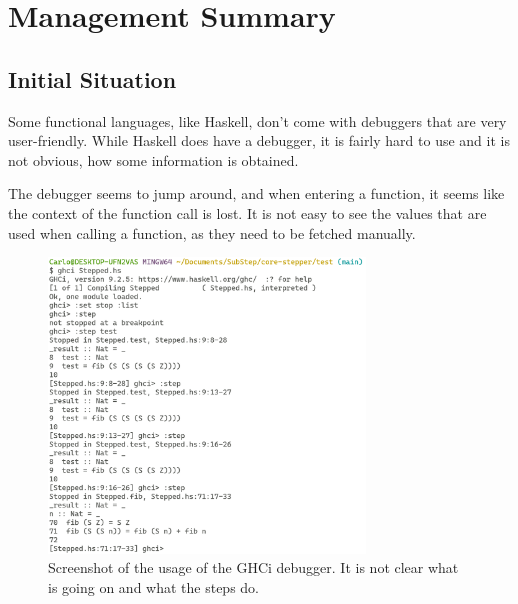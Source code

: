 \chapter{Management Summary}


\section{Initial Situation}
Some functional languages, like Haskell, don't come with debuggers that are very user-friendly.
While Haskell does have a debugger,
it is fairly hard to use and it is not obvious,
how some information is obtained.

The debugger seems to jump around,
and when entering a function,
it seems like the context of the function call is lost.
It is not easy to see the values that are used when calling a function,
as they need to be fetched manually.

\begin{figure}[!ht]
    \includegraphics[width=0.75\textwidth]{resources/ghciDebug.png}
    \caption{Screenshot of the usage of the GHCi debugger. It is not clear what is going on and what the steps do.}
\end{figure}

